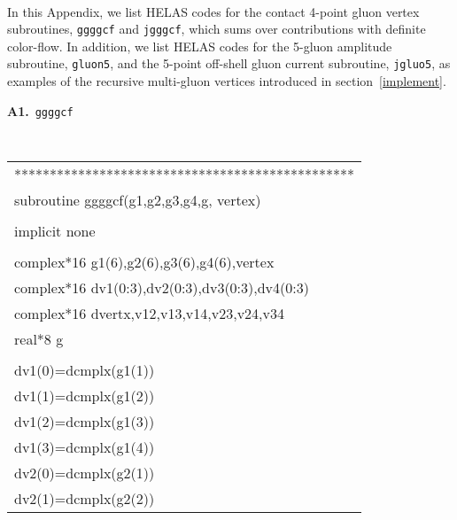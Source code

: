 \vspace{3em}
\\

In this Appendix, we list HELAS codes for the contact 4-point
 gluon vertex subroutines,
 {\tt ggggcf} and {\tt jgggcf},
 which sums over contributions with definite color-flow.
 In addition, we list HELAS codes for the 5-gluon
 amplitude subroutine, {\tt gluon5}, and
 the 5-point off-shell gluon current subroutine,
 {\tt jgluo5}, as examples of the recursive multi-gluon
 vertices introduced in section~\ref{implement}.
 
 \vspace{2em}
\begin{center}
 {\bf A1.}~{\tt ggggcf}\\
{\tt 
\begin{supertabular}{l}
************************************************\\
     \hspace{0.5em} subroutine ggggcf(g1,g2,g3,g4,g, vertex)\\
\\
      \hspace{0.5em} implicit none\\
\\
      \hspace{0.5em} complex*16    g1(6),g2(6),g3(6),g4(6),vertex\\
      \hspace{0.5em} complex*16 dv1(0:3),dv2(0:3),dv3(0:3),dv4(0:3)\\
      \hspace{0.5em} complex*16 dvertx,v12,v13,v14,v23,v24,v34\\
      \hspace{0.5em} real*8 g\\
\\
      \hspace{0.5em} dv1(0)=dcmplx(g1(1))\\
      \hspace{0.5em} dv1(1)=dcmplx(g1(2))\\
      \hspace{0.5em} dv1(2)=dcmplx(g1(3))\\
      \hspace{0.5em} dv1(3)=dcmplx(g1(4))\\
      \hspace{0.5em} dv2(0)=dcmplx(g2(1))\\
      \hspace{0.5em} dv2(1)=dcmplx(g2(2))\\

\end{supertabular}}
\end{center}
